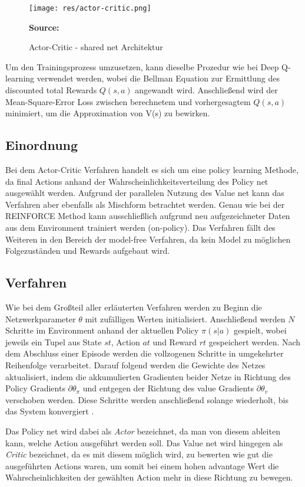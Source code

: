 \documentclass[11pt]{scrartcl}
\newcommand{\source}[1]{\vspace{-5pt} \caption*{\hfill \textbf{Source:} {#1}} }
\begin{document}
\begin{figure}[htp]
\centering
\texttt{[image: res/actor-critic.png]}
\caption{Actor-Critic - shared net Architektur}
\source{\cite[~S.268 - Chapter 10 - Figure 5]{L2018}}
\label{fig:actor-critic}
\end{figure}

Um den Trainingsprozess umzusetzen, kann dieselbe Prozedur wie bei Deep Q-learning verwendet werden, wobei
die Bellman Equation zur Ermittlung des discounted total Rewards $Q(s,a)$ angewandt wird. Anschließend wird
der Mean-Square-Error Loss zwischen berechnetem und vorhergesagtem $Q(s,a)$ minimiert, um die Approximation
von V(s) zu bewirken.


\subsection{Einordnung}
Bei dem Actor-Critic Verfahren handelt es sich um eine policy learning Methode, da final Actions anhand der
Wahrscheinlichkeitsverteilung des Policy net ausgewählt werden. Aufgrund der parallelen Nutzung des Value
net kann das Verfahren aber ebenfalls als Mischform betrachtet werden. Genau wie bei der REINFORCE Method
kann ausschließlich aufgrund neu aufgezeichneter Daten aus dem Environment trainiert werden (on-policy).
Das Verfahren fällt des Weiteren in den Bereich der model-free Verfahren, da kein Model zu möglichen
Folgezuständen und Rewards aufgebaut wird. 

\subsection{Verfahren}
Wie bei dem Großteil aller erläuterten Verfahren werden zu Beginn die Netzwerkparameter $\theta$ mit
zufälligen Werten initialisiert. Anschließend werden $N$ Schritte im Environment anhand der aktuellen
Policy $\pi(s|a)$ gespielt, wobei jeweils ein Tupel aus State $st$, Action $at$ und Reward $rt$
gespeichert werden. Nach dem Abschluss einer Episode werden die vollzogenen Schritte in
umgekehrter Reihenfolge verarbeitet. Darauf folgend werden die Gewichte des Netzes aktualisiert, indem
die akkumulierten Gradienten beider Netze in Richtung des Policy Gradients $\partial\theta_\pi$
und entgegen der Richtung des value Gradients $\partial\theta_v$ verschoben werden. Diese Schritte
werden anschließend solange wiederholt, bis das System konvergiert \cite[~S.268 f.]{L2018}.

Das Policy net wird dabei als \textit{Actor} bezeichnet, da man von diesem ableiten kann, welche
Action ausgeführt werden soll. Das Value net wird hingegen als \textit{Critic} bezeichnet, da es mit
diesem möglich wird, zu bewerten wie gut die ausgeführten Actions waren, um somit bei einem hohen
advantage Wert die Wahrscheinlichkeiten der gewählten Action mehr in diese Richtung zu bewegen.
\end{document}
